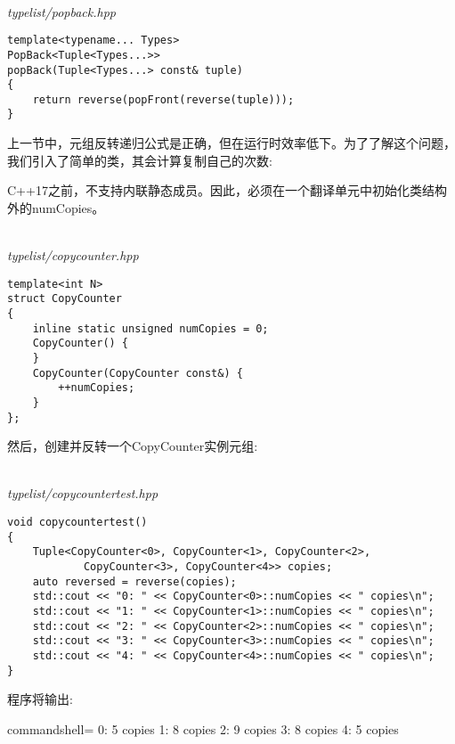 \hspace*{\fill} \\ %
\noindent
\textit{typelist/popback.hpp}
\begin{lstlisting}[style=styleCXX]
template<typename... Types>
PopBack<Tuple<Types...>>
popBack(Tuple<Types...> const& tuple)
{
	return reverse(popFront(reverse(tuple)));
}
\end{lstlisting}


上一节中，元组反转递归公式是正确，但在运行时效率低下。为了了解这个问题，我们引入了简单的类，其会计算复制自己的次数:

\begin{tcolorbox}[colback=webgreen!5!white,colframe=webgreen!75!black]
\hspace*{0.75cm}C++17之前，不支持内联静态成员。因此，必须在一个翻译单元中初始化类结构外的numCopies。
\end{tcolorbox}

\hspace*{\fill} \\ %
\noindent
\textit{typelist/copycounter.hpp}
\begin{lstlisting}[style=styleCXX]
template<int N>
struct CopyCounter
{
	inline static unsigned numCopies = 0;
	CopyCounter() {
	}
	CopyCounter(CopyCounter const&) {
		++numCopies;
	}
};
\end{lstlisting}

然后，创建并反转一个CopyCounter实例元组:

\hspace*{\fill} \\ %
\noindent
\textit{typelist/copycountertest.hpp}
\begin{lstlisting}[style=styleCXX]
void copycountertest()
{
	Tuple<CopyCounter<0>, CopyCounter<1>, CopyCounter<2>,
			CopyCounter<3>, CopyCounter<4>> copies;
	auto reversed = reverse(copies);
	std::cout << "0: " << CopyCounter<0>::numCopies << " copies\n";
	std::cout << "1: " << CopyCounter<1>::numCopies << " copies\n";
	std::cout << "2: " << CopyCounter<2>::numCopies << " copies\n";
	std::cout << "3: " << CopyCounter<3>::numCopies << " copies\n";
	std::cout << "4: " << CopyCounter<4>::numCopies << " copies\n";
}
\end{lstlisting}

程序将输出:

\begin{tcblisting}{commandshell={}}
0: 5 copies
1: 8 copies
2: 9 copies
3: 8 copies
4: 5 copies
\end{tcblisting}

